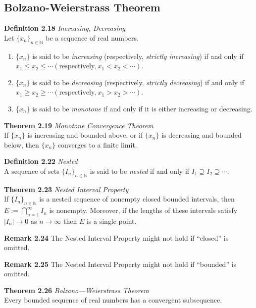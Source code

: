 \documentclass[8pt,landscape]{article}
\begin{document}
\begin{multicols}{3}
    \subsection{Bolzano-Weierstrass Theorem}



    \textbf{Definition 2.18} \emph{Increasing, Decreasing} \\
    Let ${\{x_n\}}_{n \in \mathbb{N}}$ be a sequence of real numbers.
    \begin{enumerate}
        \item $\{x_n\}$ is said to be \emph{increasing}
            (respectively, \emph{strictly increasing}) if and only if
            $x_1 \leq x_2 \leq \cdots (\text{respectively}, x_1 < x_2 < \cdots)$.
        \item $\{x_n\}$ is said to be \emph{decreasing}
            (respectively, \emph{strictly decreasing}) if and only if
            $x_1 \geq x_2 \geq \cdots (\text{respectively}, x_1 > x_2 > \cdots)$.
        \item $\{x_n\}$ is said to be \emph{monotone} if and only if it is either
            increasing or decreasing.
    \end{enumerate}

    \textbf{Theorem 2.19} \emph{Monotone Convergence Theorem} \\
    If $\{x_n\}$ is increasing and bounded above, or if $\{x_n\}$ is decreasing and bounded
    below, then $\{x_n\}$ converges to a finite limit.

    \textbf{Definition 2.22} \emph{Nested} \\
    A sequence of sets ${\{I_n\}}_{n \in \mathbb{N}}$ is said to be \emph{nested}
    if and only if
    $I_1 \supseteq I_2 \supseteq \cdots$.

    \textbf{Theorem 2.23} \emph{Nested Interval Property} \\
    If ${\{I_n\}}_{n \in \mathbb{N}}$ is a nested sequence of nonempty closed bounded
    intervals, then $E := \bigcap_{n=1}^\infty I_n$ is nonempty.
    Moreover, if the lengths of these intervals satisfy $|I_n| \to 0$ as $n \to \infty$
    then $E$ is a single point.

    \textbf{Remark 2.24}
    The Nested Interval Property might not hold if ``closed'' is omitted.

    \textbf{Remark 2.25}
    The Nested Interval Property might not hold if ``bounded'' is omitted.

    \textbf{Theorem 2.26} \emph{Bolzano---Weierstrass Theorem} \\
    Every bounded sequence of real numbers has a convergent subsequence.



\end{multicols}
\end{document}
